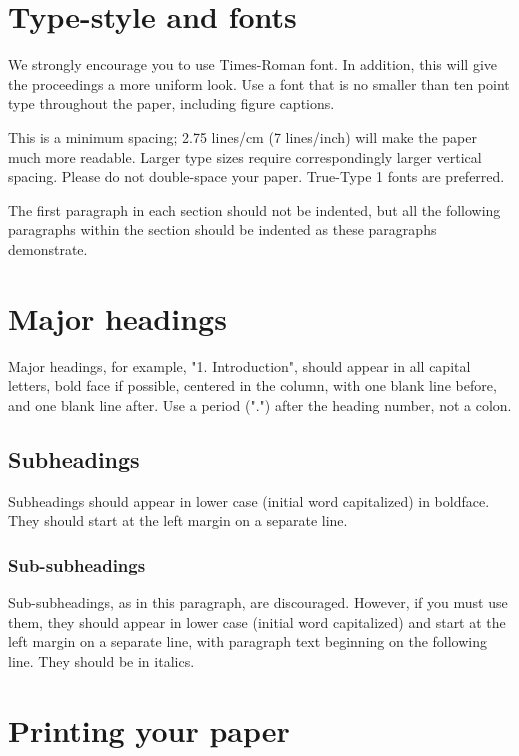 \documentclass{article}
\begin{document}
\section{Type-style and fonts}
\label{sec:typestyle}

We strongly encourage you to use Times-Roman font. In addition, this will give the proceedings a more uniform look. Use a font that is no smaller than ten point type throughout the paper, including figure captions.

This is a minimum spacing; 2.75 lines/cm (7 lines/inch) will make the paper much more readable. Larger type sizes require correspondingly larger vertical spacing. Please do not double-space your paper. True-Type 1 fonts are preferred.

The first paragraph in each section should not be indented, but all the following paragraphs within the section should be indented as these paragraphs demonstrate.

\section{Major headings}
\label{sec:majhead}

Major headings, for example, "1. Introduction", should appear in all capital letters, bold face if possible, centered in the column, with one blank line before, and one blank line after. Use a period (".") after the heading number, not a colon.

\subsection{Subheadings}
\label{ssec:subhead}

Subheadings should appear in lower case (initial word capitalized) in boldface. They should start at the left margin on a separate line.

\subsubsection{Sub-subheadings}
\label{sssec:subsubhead}

Sub-subheadings, as in this paragraph, are discouraged. However, if you must use them, they should appear in lower case (initial word capitalized) and start at the left margin on a separate line, with paragraph text beginning on the following line. They should be in italics.

\section{Printing your paper}
\label{sec:print}
\end{document}
